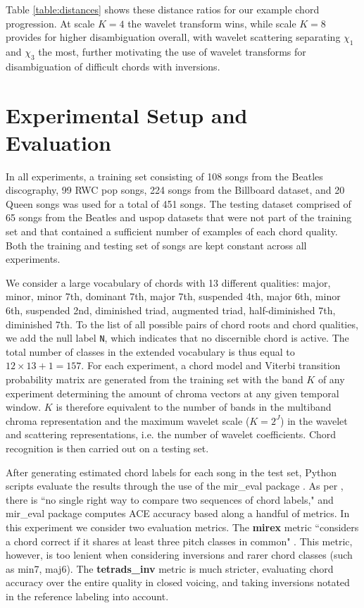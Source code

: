 \documentclass{article}
\makeatletter
\newcommand*{\ie}{i.e.\@\xspace}
\makeatother
\begin{document}
Table \ref{table:distances} shows these distance ratios for our example chord progression. At scale $K=4$ the wavelet transform wins, while scale $K=8$ provides for higher disambiguation overall, with wavelet scattering separating $\chi_1$ and $\chi_3$ the most, further motivating the use of wavelet transforms for disambiguation of difficult chords with inversions.

\section{Experimental Setup and Evaluation}\label{sec:experiment}

In all experiments, a training set consisting of 108 songs from the Beatles
discography, 99 RWC pop songs, 224 songs from the Billboard dataset, and 20 Queen songs was used for a total of 451 songs.
The testing dataset comprised of 65 songs from the Beatles and uspop datasets that were not part
of the training set and that contained a sufficient number of examples of each chord quality. 
Both the training and testing set of songs are kept constant across all experiments.
	
We consider a large vocabulary of chords with 13 different qualities:
major, minor, minor 7th, dominant 7th, major 7th, suspended 4th, major 6th, minor 6th, suspended 2nd, diminished triad, augmented triad, half-diminished 7th, diminished 7th.
To the list of all possible pairs of chord roots and chord qualities,
we add the null label \texttt{N}, which indicates that no discernible chord is active.
The total number of classes in the extended vocabulary is thus equal to
$12 \times 13 + 1 = 157$.
For each experiment, a chord model and Viterbi transition probability matrix are generated from the  training set with the band $K$ of any experiment determining the amount of chroma vectors at any given temporal window.
$K$ is therefore equivalent to the number of bands in the multiband chroma representation and the maximum wavelet scale ($K = 2^J$) in the wavelet and scattering representations, \ie the number of wavelet coefficients.
Chord recognition is then carried out on a testing set.

After generating estimated chord labels for each song in the test set, Python scripts evaluate the results through the use of the mir\_eval package \cite{raffel2014mir}.
As per \cite{raffel2014mir}, there is ``no single right way to compare two sequences of chord labels,"
and mir\_eval package computes ACE accuracy based along a handful of metrics.
In this experiment we consider two evaluation metrics. The \textbf{mirex} metric ``considers a chord
correct if it shares at least three pitch classes in common" \cite{raffel2014mir}. This metric, however, is too lenient when considering inversions and rarer chord classes (such as min7, maj6). The \textbf{tetrads\_inv} metric is much stricter, evaluating chord accuracy over the entire quality in closed voicing, and taking inversions notated in the reference labeling into account.
\end{document}
